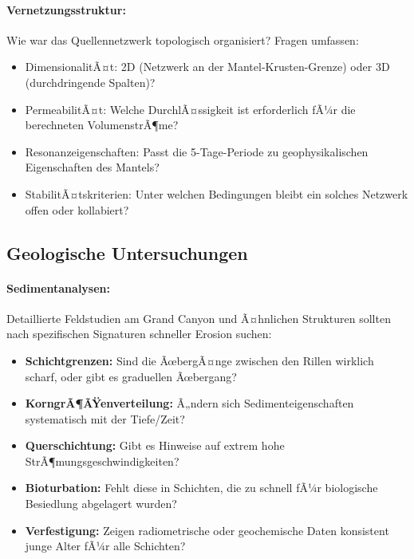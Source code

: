 ﻿\documentclass[12pt,a4paper]{report}
\begin{document}
\paragraph{Vernetzungsstruktur:}
Wie war das Quellennetzwerk topologisch organisiert? Fragen umfassen:
\begin{itemize}
	\item DimensionalitÃ¤t: 2D (Netzwerk an der Mantel-Krusten-Grenze) oder 3D (durchdringende Spalten)?
	\item PermeabilitÃ¤t: Welche DurchlÃ¤ssigkeit ist erforderlich fÃ¼r die berechneten VolumenstrÃ¶me?
	\item Resonanzeigenschaften: Passt die 5-Tage-Periode zu geophysikalischen Eigenschaften des Mantels?
	\item StabilitÃ¤tskriterien: Unter welchen Bedingungen bleibt ein solches Netzwerk offen oder kollabiert?
\end{itemize}

\subsection{Geologische Untersuchungen}

\paragraph{Sedimentanalysen:}
Detaillierte Feldstudien am Grand Canyon und Ã¤hnlichen Strukturen sollten nach spezifischen Signaturen schneller Erosion suchen:

\begin{itemize}
	\item \textbf{Schichtgrenzen:} Sind die ÃœbergÃ¤nge zwischen den Rillen wirklich scharf, oder gibt es graduellen Ãœbergang?
	
	\item \textbf{KorngrÃ¶ÃŸenverteilung:} Ã„ndern sich Sedimenteigenschaften systematisch mit der Tiefe/Zeit?
	
	\item \textbf{Querschichtung:} Gibt es Hinweise auf extrem hohe StrÃ¶mungsgeschwindigkeiten?
	
	\item \textbf{Bioturbation:} Fehlt diese in Schichten, die zu schnell fÃ¼r biologische Besiedlung abgelagert wurden?
	
	\item \textbf{Verfestigung:} Zeigen radiometrische oder geochemische Daten konsistent junge Alter fÃ¼r alle Schichten?
\end{itemize}
\end{document}
